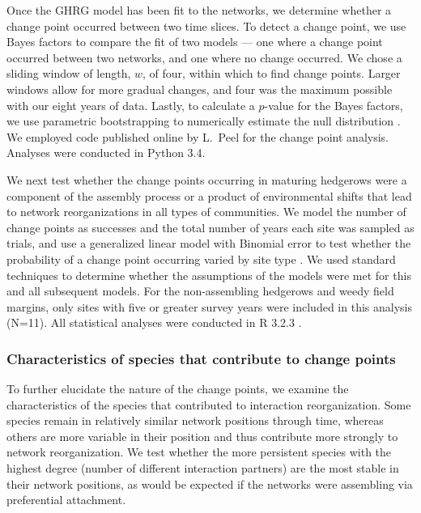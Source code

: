 \documentclass[12pt]{article}
\begin{document}
Once the GHRG model has been fit to the networks, we determine whether
a change point occurred between two time slices. To detect a change
point, we use Bayes factors to compare the fit of two models --- one
where a change point occurred between two networks, and one where no
change occurred. We chose a sliding window of length, $w$, of four,
within which to find change points. Larger windows allow for more
gradual changes, and four was the maximum possible with our eight
years of data. Lastly, to calculate a $p$-value for the Bayes factors,
we use parametric bootstrapping to numerically estimate the null
distribution \citep{peel2014detecting}. We employed code published
online by L.~Peel for the change point analysis. Analyses were
conducted in Python 3.4.

We next test whether the change points occurring in maturing hedgerows
were a component of the assembly process or a product of environmental
shifts that lead to network reorganizations in all types of
communities. We model the number of change points as successes and the
total number of years each site was sampled as trials, and use a
generalized linear model with Binomial error to test whether the
probability of a change point occurring varied by site type
\citep{lme4}. We used standard techniques to determine whether the
assumptions of the models were met for this and all subsequent
models. For the non-assembling hedgerows and weedy field margins, only
sites with five or greater survey years were included in this analysis
(N=11). All statistical analyses were conducted in R 3.2.3 \citep{R}.

\subsubsection*{Characteristics of species that contribute to change
  points}

To further elucidate the nature of the change points, we examine the
characteristics of the species that contributed to interaction
reorganization. Some species remain in relatively similar network
positions through time, whereas others are more variable in their
position and thus contribute more strongly to network
reorganization. We test whether the more persistent species with the
highest degree (number of different interaction partners) are the
most stable in their network positions, as would be expected if the
networks were assembling via preferential attachment.
\end{document}
